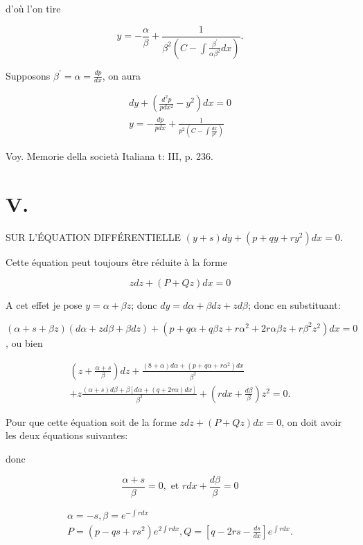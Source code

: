 \documentclass{article}
\begin{document}
d'où l'on tire

\[
y=-\frac{\alpha}{\beta}+\frac{1}{\beta^{2}\left(C-\int \frac{\beta^{\prime}}{\alpha \beta^{2}} d x\right)} .
\]

Supposons \(\beta^{\prime}=\alpha=\frac{d p}{d x}\), on aura

\[
\begin{gathered}
d y+\left(\frac{d^{2} p}{p d x^{2}}-y^{2}\right) d x=0 \\
y=-\frac{d p}{p d x}+\frac{1}{p^{2}\left(C-\int \frac{d x}{p^{2}}\right)}
\end{gathered}
\]

Voy. Memorie della società Italiana t: III, p. 236.

\section*{V.}

SUR L'ÉQUATION DIFFÉRENTIELLE \((y+s) d y+\left(p+q y+r y^{2}\right) d x=0\).

Cette équation peut toujours être réduite à la forme

\[
z d z+(P+Q z) d x=0
\]

A cet effet je pose \(y=\alpha+\beta z\); donc \(d y=d \alpha+\beta d z+z d \beta\); donc en substituant:

\((\alpha+s+\beta z)(d \alpha+z d \beta+\beta d z)+\left(p+q \alpha+q \beta z+r \alpha^{2}+2 r \alpha \beta z+r \beta^{2} z^{2}\right) d x=0\), ou bien

\[
\begin{gathered}
\left(z+\frac{\alpha+s}{\beta}\right) d z+\frac{(8+\alpha) d \alpha+\left(p+q \alpha+r \alpha^{2}\right) d x}{\beta^{2}} \\
+z \frac{(\alpha+s) d \beta+\beta[d \alpha+(q+2 r \alpha) d x]}{\beta^{2}}+\left(r d x+\frac{d \beta}{\beta}\right) z^{2}=0 .
\end{gathered}
\]

Pour que cette équation soit de la forme \(z d z+(P+Q z) d x=0\), on doit avoir les deux équations suivantes:

donc

\[
\frac{\alpha+s}{\beta}=0, \text { et } r d x+\frac{d \beta}{\beta}=0
\]

\[
\begin{gathered}
\alpha=-s, \beta=e^{-\int r d x} \\
P=\left(p-q s+r s^{2}\right) e^{2 \int r d x}, Q=\left[q-2 r s-\frac{d s}{d x}\right] e^{\int r d x} .
\end{gathered}
\]
\end{document}
